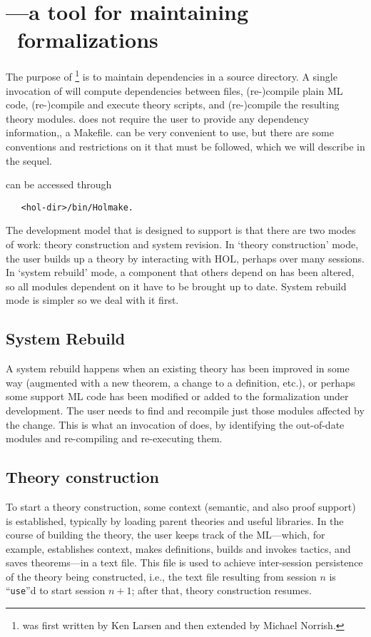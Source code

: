 \section{\holmake---a tool for maintaining \HOL\ formalizations}
\label{Holmake}

The purpose of \holmake\footnote{\holmake{} was first written by Ken
  Larsen and then extended by Michael Norrish.} is to maintain
dependencies in a \holn{} source directory. A single invocation of
\holmake{} will compute dependencies between files, (re-)compile plain
ML code, (re-)compile and execute theory scripts, and (re-)compile the
resulting theory modules. \holmake{} does not require the user to
provide any dependency information,\eg, a Makefile. \holmake{} can be
very convenient to use, but there are some conventions and
restrictions on it that must be followed, which we will describe in
the sequel.

\holmake{} can be accessed through
\begin{verbatim}
   <hol-dir>/bin/Holmake.
\end{verbatim}

The development model that \holmake{} is designed to support is that
there are two modes of work: theory construction and system revision.
In `theory construction' mode, the user builds up a theory by
interacting with HOL, perhaps over many sessions. In `system rebuild'
mode, a component that others depend on has been altered, so all modules
dependent on it have to be brought up to date. System rebuild mode is
simpler so we deal with it first.

\subsection{System Rebuild}

A system rebuild happens when an existing theory has been improved in
some way (augmented with a new theorem, a change to a definition,
etc.), or perhaps some support ML code has been modified or added to
the formalization under development. The user needs to find and
recompile just those modules affected by the change. This is what an
invocation of \holmake{} does, by identifying the out-of-date modules
and re-compiling and re-executing them.


\subsection{Theory construction}

To start a theory construction, some context (semantic, and also proof
support) is established, typically by loading parent theories and
useful libraries. In the course of building the theory, the user keeps
track of the ML---which, for example, establishes context, makes
definitions, builds and invokes tactics, and saves theorems---in a
text file. This file is used to achieve inter-session persistence of
the theory being constructed, i.e., the text file resulting from
session $n$ is ``\verb+use+''d to start session $n+1$; after that,
theory construction resumes.

